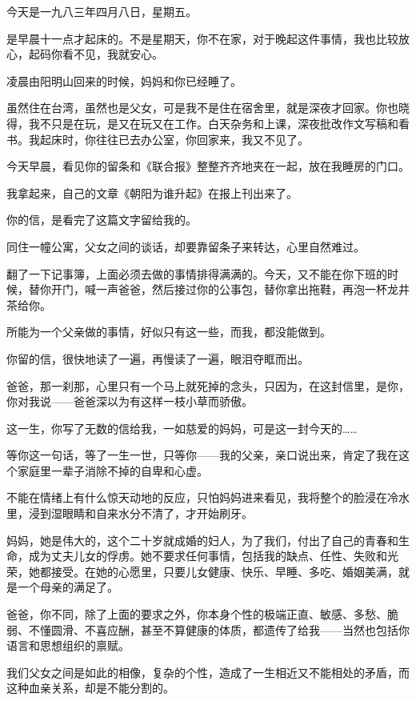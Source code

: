 \par {}
\par 今天是一九八三年四月八日，星期五。
\par 是早晨十一点才起床的。不是星期天，你不在家，对于晚起这件事情，我也比较放心，起码你看不见，我就安心。
\par 凌晨由阳明山回来的时候，妈妈和你已经睡了。
\par 虽然住在台湾，虽然也是父女，可是我不是住在宿舍里，就是深夜才回家。你也晓得，我不只是在玩，是又在玩又在工作。白天杂务和上课，深夜批改作文写稿和看书。我起床时，你往往已去办公室，你回家来，我又不见了。
\par 今天早晨，看见你的留条和《联合报》整整齐齐地夹在一起，放在我睡房的门口。
\par 我拿起来，自己的文章《朝阳为谁升起》在报上刊出来了。
\par 你的信，是看完了这篇文字留给我的。
\par 同住一幢公寓，父女之间的谈话，却要靠留条子来转达，心里自然难过。
\par 翻了一下记事簿，上面必须去做的事情排得满满的。今天，又不能在你下班的时候，替你开门，喊一声爸爸，然后接过你的公事包，替你拿出拖鞋，再泡一杯龙井茶给你。
\par 所能为一个父亲做的事情，好似只有这一些，而我，都没能做到。
\par 你留的信，很快地读了一遍，再慢读了一遍，眼泪夺眶而出。
\par 爸爸，那一刹那，心里只有一个马上就死掉的念头，只因为，在这封信里，是你，你对我说——爸爸深以为有这样一枝小草而骄傲。
\par 这一生，你写了无数的信给我，一如慈爱的妈妈，可是这一封今天的……
\par 等你这一句话，等了一生一世，只等你——我的父亲，亲口说出来，肯定了我在这个家庭里一辈子消除不掉的自卑和心虚。
\par 不能在情绪上有什么惊天动地的反应，只怕妈妈进来看见，我将整个的脸浸在冷水里，浸到湿眼睛和自来水分不清了，才开始刷牙。
\par 妈妈，她是伟大的，这个二十岁就成婚的妇人，为了我们，付出了自己的青春和生命，成为丈夫儿女的俘虏。她不要求任何事情，包括我的缺点、任性、失败和光荣，她都接受。在她的心愿里，只要儿女健康、快乐、早睡、多吃、婚姻美满，就是一个母亲的满足了。
\par 爸爸，你不同，除了上面的要求之外，你本身个性的极端正直、敏感、多愁、脆弱、不懂圆滑、不喜应酬，甚至不算健康的体质，都遗传了给我——当然也包括你语言和思想组织的禀赋。
\par 我们父女之间是如此的相像，复杂的个性，造成了一生相近又不能相处的矛盾，而这种血亲关系，却是不能分割的。
